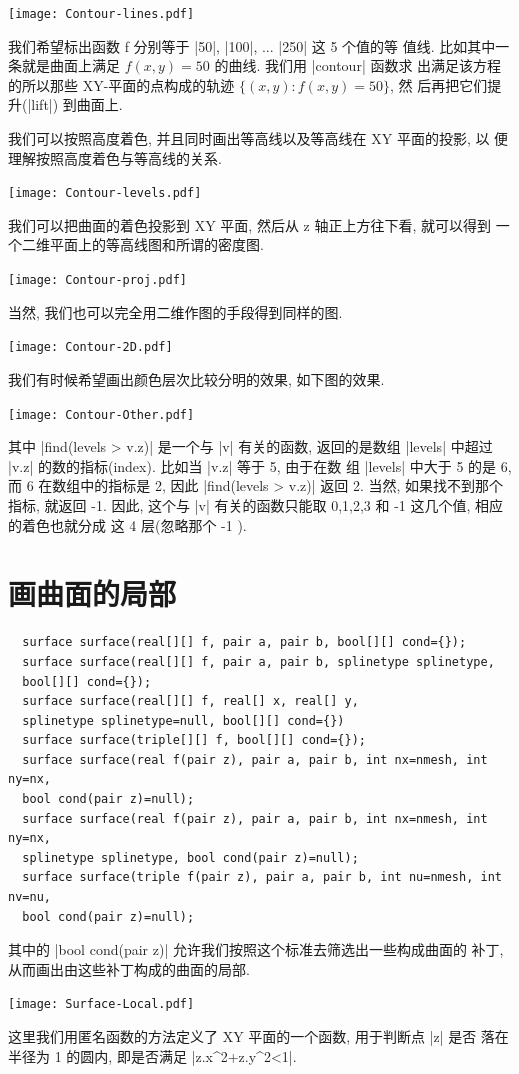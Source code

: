 \documentclass[nofonts,CJKnormalspaces]{ctexbook}[2009/05/20]
\begin{document}
\begin{center}\texttt{[image: Contour-lines.pdf]}\end{center}%

我们希望标出函数 f 分别等于 |50|, |100|, ... |250| 这 5 个值的等
值线. 比如其中一条就是曲面上满足 $f(x,y)=50$ 的曲线. 我们用 |contour| 函数求
出满足该方程的所以那些 XY-平面的点构成的轨迹 $\{(x,y):f(x,y)=50\}$, 然
后再把它们提升(|lift|) 到曲面上.

我们可以按照高度着色, 并且同时画出等高线以及等高线在 XY 平面的投影, 以
便理解按照高度着色与等高线的关系.
\begin{center}\texttt{[image: Contour-levels.pdf]}\end{center}%

我们可以把曲面的着色投影到 XY 平面, 然后从 z 轴正上方往下看, 就可以得到
一个二维平面上的等高线图和所谓的密度图.
\begin{center}\texttt{[image: Contour-proj.pdf]}\end{center}%

当然, 我们也可以完全用二维作图的手段得到同样的图.
\begin{center}\texttt{[image: Contour-2D.pdf]}\end{center}%

我们有时候希望画出颜色层次比较分明的效果, 如下图的效果.
\begin{center}\texttt{[image: Contour-Other.pdf]}\end{center}%

其中 |find(levels > v.z)| 是一个与 |v| 有关的函数, 返回的是数组
|levels| 中超过 |v.z| 的数的指标(index). 比如当 |v.z| 等于 5, 由于在数
组 |levels| 中大于 5 的是 6, 而 6 在数组中的指标是 2, 因此
|find(levels > v.z)| 返回 2. 当然, 如果找不到那个指标, 就返回 -1. 因此,
这个与 |v| 有关的函数只能取 0,1,2,3 和 -1 这几个值, 相应的着色也就分成
这 4 层(忽略那个 -1 ).

\section{画曲面的局部}
\begin{lstlisting}
  surface surface(real[][] f, pair a, pair b, bool[][] cond={});
  surface surface(real[][] f, pair a, pair b, splinetype splinetype,
  bool[][] cond={});
  surface surface(real[][] f, real[] x, real[] y,
  splinetype splinetype=null, bool[][] cond={})
  surface surface(triple[][] f, bool[][] cond={});
  surface surface(real f(pair z), pair a, pair b, int nx=nmesh, int ny=nx,
  bool cond(pair z)=null);
  surface surface(real f(pair z), pair a, pair b, int nx=nmesh, int ny=nx,
  splinetype splinetype, bool cond(pair z)=null);
  surface surface(triple f(pair z), pair a, pair b, int nu=nmesh, int nv=nu,
  bool cond(pair z)=null);
\end{lstlisting}
其中的 |bool cond(pair z)| 允许我们按照这个标准去筛选出一些构成曲面的
补丁, 从而画出由这些补丁构成的曲面的局部.
\begin{center}\texttt{[image: Surface-Local.pdf]}\end{center}%

这里我们用匿名函数的方法定义了 XY 平面的一个函数, 用于判断点 |z| 是否
落在半径为 1 的圆内, 即是否满足 |z.x^2+z.y^2<1|.
\end{document}
